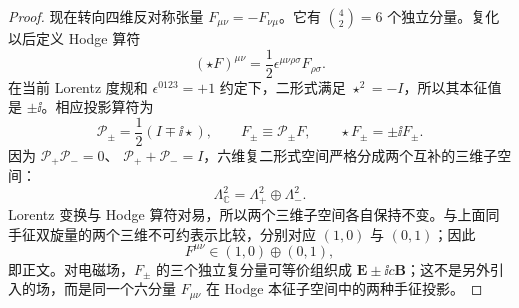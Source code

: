 \begin{proof}
现在转向四维反对称张量 $F_{\mu\nu}=-F_{\nu\mu}$。它有
$\binom42=6$ 个独立分量。复化以后定义 Hodge 算符
\begin{equation*}
 (\star F)^{\mu\nu}
 =\frac12\epsilon^{\mu\nu\rho\sigma}F_{\rho\sigma}.
\end{equation*}
在当前 Lorentz 度规和 $\epsilon^{0123}=+1$ 约定下，二形式满足
$\star^2=-I$，所以其本征值是 $\pm\ii$。相应投影算符为
\begin{equation*}
 \mathcal P_\pm=\frac12(I\mp\ii\star),
 \qquad
 F_\pm\equiv\mathcal P_\pm F,
 \qquad
 \star F_\pm=\pm\ii F_\pm.
\end{equation*}
因为
$\mathcal P_+\mathcal P_-=0$、
$\mathcal P_++\mathcal P_-=I$，六维复二形式空间严格分成两个互补的三维子空间：
\begin{equation*}
 \Lambda^2_\mathbb C
 =\Lambda^2_+\oplus\Lambda^2_-.
\end{equation*}
Lorentz 变换与 Hodge 算符对易，所以两个三维子空间各自保持不变。与上面同手征双旋量的两个三维不可约表示比较，分别对应 $(1,0)$ 与 $(0,1)$；因此
\begin{equation*}
 F^{\mu\nu}\in(1,0)\oplus(0,1),
\end{equation*}
即正文。对电磁场，$F_\pm$ 的三个独立复分量可等价组织成 $\mathbf E\pm\ii c\mathbf B$；这不是另外引入的场，而是同一个六分量 $F_{\mu\nu}$ 在 Hodge 本征子空间中的两种手征投影。
\end{proof}

